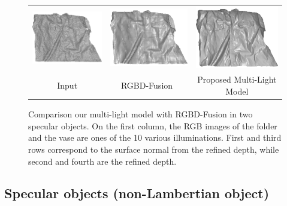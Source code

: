 \begin{figure}[!ht]
{\begin{tabular}{c|c c}
   \includegraphics[height = 0.24\linewidth]{figures/result/robust_patternShirt_shape_init.pdf} 
   &
   \includegraphics[height = 0.24\linewidth]{figures/result/rgbd_patternShirt_shape.pdf} &
   \includegraphics[height = 0.24\linewidth]{figures/result/robust_patternShirt_shape.pdf}\\


   {Input} & {RGBD-Fusion~\cite{or2015rgbd}} & {Proposed Multi-Light Model}               
 \end{tabular}}
\caption{Comparison our multi-light model with RGBD-Fusion in two specular objects. On the first column, the RGB images of the folder and the vase are ones of  the 10 various illuminations. First and third rows correspond to the surface normal from the refined depth, while second and fourth are the refined depth.}
\label{fig:comp_complicated_albedo}
\end{figure}

\subsection{Specular objects (non-Lambertian object)}


